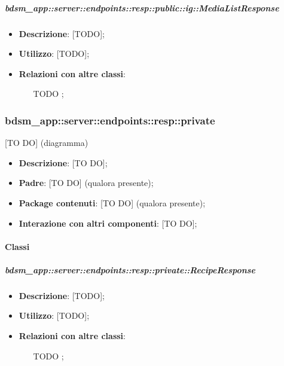     \subparagraph{bdsm\_app::server::endpoints::resp::public::ig::MediaListResponse} %
    \label{subp:bdsm_app_server_endpoints_resp_public_ig_medialistresponse}
    \begin{itemize}
      \item \textbf{Descrizione}: [TODO];
      \item \textbf{Utilizzo}: [TODO];
      \item \textbf{Relazioni con altre classi}:
        \begin{itemize}
          \item [TODO];
        \end{itemize}
      \end{itemize}

\subsubsection{bdsm\_app::server::endpoints::resp::private} %
\label{ssub:bdsm_app_server_endpoints_resp_private}
[TO DO] (diagramma) \newline \newline

\begin{itemize}
  \item \textbf{Descrizione}: [TO DO];
  \item \textbf{Padre}: [TO DO] (qualora presente);
  \item \textbf{Package contenuti}: [TO DO] (qualora presente);
  \item \textbf{Interazione con altri componenti}: [TO DO];
\end{itemize}

	\paragraph{Classi} %

    \subparagraph{bdsm\_app::server::endpoints::resp::private::RecipeResponse} %
    \label{subp:bdsm_app_server_endpoints_resp_private_reciperesponse}
    \begin{itemize}
      \item \textbf{Descrizione}: [TODO];
      \item \textbf{Utilizzo}: [TODO];
      \item \textbf{Relazioni con altre classi}:
        \begin{itemize}
          \item [TODO];
        \end{itemize}
      \end{itemize}
    

